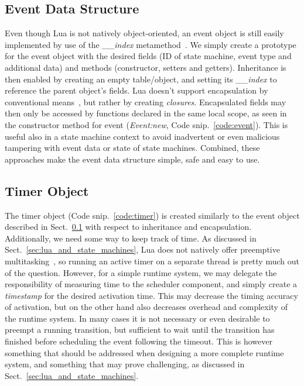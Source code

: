 \subsection{Event Data Structure}
\label{sec:impl_event}
Even though Lua is not natively object-oriented, an event object is still easily implemented by use of the \emph{\_\_index} metamethod~\cite[ch. 13.4.1]{book:programming_in_lua_first}. We simply create a prototype for the event object with the desired fields (ID of state machine, event type and additional data) and methods (constructor, setters and getters). Inheritance is then enabled by creating an empty table/object, and setting its \emph{\_\_index} to reference the parent object's fields. Lua doesn't support encapsulation by conventional means~\cite[ch. 16.4]{book:programming_in_lua_first}, but rather by creating \emph{closures}. Encapsulated fields may then only be accessed by functions declared in the same local scope, as seen in the constructor method for event (\emph{Event:new}, Code snip.~\ref{code:event}). This is useful also in a state machine context to avoid inadvertent or even malicious tampering with event data or state of state machines. Combined, these approaches make the event data structure simple, safe and easy to use.

\subsection{Timer Object}
\label{sec:impl_timer}
The timer object (Code snip.~\ref{code:timer}) is created similarly to the event object described in Sect.~\ref{sec:impl_event} with respect to inheritance and encapsulation. Additionally, we need some way to keep track of time. As discussed in Sect.~\ref{sec:lua_and_state_machines}, Lua does not natively offer preemptive multitasking~\cite[ch. 2.6]{manual:lua_reference_manual}, so running an active timer on a separate thread is pretty much out of the question. However, for a simple runtime system, we may delegate the responsibility of measuring time to the scheduler component, and simply create a \emph{timestamp} for the desired activation time. This may decrease the timing accuracy of activation, but on the other hand also decreases overhead and complexity of the runtime system. In many cases it is not necessary or even desirable to preempt a running transition, but sufficient to wait until the transition has finished before scheduling the event following the timeout. This is however something that should be addressed when designing a more complete runtime system, and something that may prove challenging, as discussed in Sect.~\ref{sec:lua_and_state_machines}.

